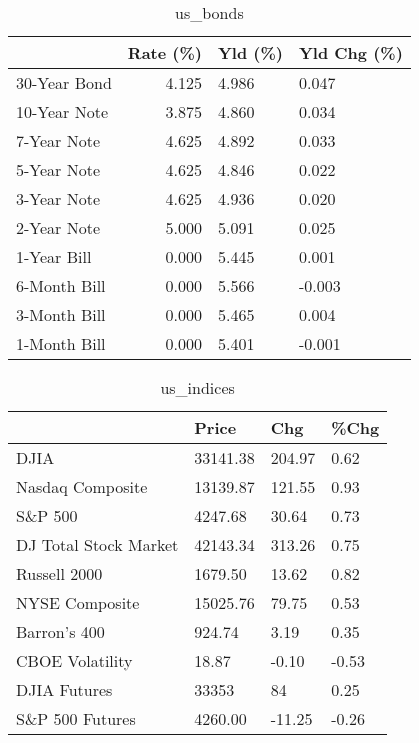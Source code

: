 \documentclass{article}%
\begin{document}
%


\begin{table}[htbp]%
\caption{us\_bonds}%
\centering%
\begin{adjustbox}{width=1\textwidth}%
\begin{tabular}{lrll}
\toprule
             &  Rate (\%) & Yld (\%) & Yld Chg (\%) \\
\midrule
30-Year Bond &     4.125 &   4.986 &       0.047 \\
10-Year Note &     3.875 &   4.860 &       0.034 \\
 7-Year Note &     4.625 &   4.892 &       0.033 \\
 5-Year Note &     4.625 &   4.846 &       0.022 \\
 3-Year Note &     4.625 &   4.936 &       0.020 \\
 2-Year Note &     5.000 &   5.091 &       0.025 \\
 1-Year Bill &     0.000 &   5.445 &       0.001 \\
6-Month Bill &     0.000 &   5.566 &      -0.003 \\
3-Month Bill &     0.000 &   5.465 &       0.004 \\
1-Month Bill &     0.000 &   5.401 &      -0.001 \\
\bottomrule
\end{tabular}
%
\end{adjustbox}%
\end{table}

%


\begin{table}[htbp]%
\caption{us\_indices}%
\centering%
\begin{adjustbox}{width=1\textwidth}%
\begin{tabular}{llll}
\toprule
                      &    Price &    Chg &  \%Chg \\
\midrule
                 DJIA & 33141.38 & 204.97 &  0.62 \\
     Nasdaq Composite & 13139.87 & 121.55 &  0.93 \\
              S\&P 500 &  4247.68 &  30.64 &  0.73 \\
DJ Total Stock Market & 42143.34 & 313.26 &  0.75 \\
         Russell 2000 &  1679.50 &  13.62 &  0.82 \\
       NYSE Composite & 15025.76 &  79.75 &  0.53 \\
         Barron's 400 &   924.74 &   3.19 &  0.35 \\
      CBOE Volatility &    18.87 &  -0.10 & -0.53 \\
         DJIA Futures &    33353 &     84 &  0.25 \\
      S\&P 500 Futures &  4260.00 & -11.25 & -0.26 \\
\bottomrule
\end{tabular}
%
\end{adjustbox}%
\end{table}
\end{document}
